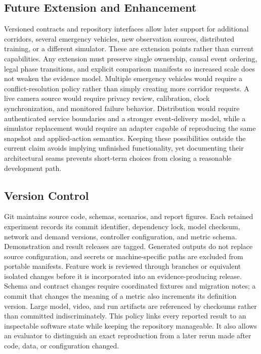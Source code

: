 \subsection{Future Extension and Enhancement}

Versioned contracts and repository interfaces allow later support for additional corridors, several emergency vehicles, new observation sources, distributed training, or a different simulator. These are extension points rather than current capabilities. Any extension must preserve single ownership, causal event ordering, legal phase transitions, and explicit comparison manifests so increased scale does not weaken the evidence model. Multiple emergency vehicles would require a conflict-resolution policy rather than simply creating more corridor requests. A live camera source would require privacy review, calibration, clock synchronization, and monitored failure behavior. Distribution would require authenticated service boundaries and a stronger event-delivery model, while a simulator replacement would require an adapter capable of reproducing the same snapshot and applied-action semantics. Keeping these possibilities outside the current claim avoids implying unfinished functionality, yet documenting their architectural seams prevents short-term choices from closing a reasonable development path.

\subsection{Version Control}

Git maintains source code, schemas, scenarios, and report figures. Each retained experiment records its commit identifier, dependency lock, model checksum, network and demand versions, controller configuration, and metric schema. Demonstration and result releases are tagged. Generated outputs do not replace source configuration, and secrets or machine-specific paths are excluded from portable manifests. Feature work is reviewed through branches or equivalent isolated changes before it is incorporated into an evidence-producing release. Schema and contract changes require coordinated fixtures and migration notes; a commit that changes the meaning of a metric also increments its definition version. Large model, video, and run artifacts are referenced by checksums rather than committed indiscriminately. This policy links every reported result to an inspectable software state while keeping the repository manageable. It also allows an evaluator to distinguish an exact reproduction from a later rerun made after code, data, or configuration changed.


